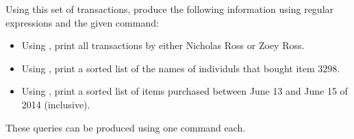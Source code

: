 Using this set of transactions, produce the following information using regular expressions and the given command:
\begin{itemize}
    \item Using , print all transactions by either Nicholas Ross or Zoey Ross.
    \item Using , print a sorted list of the names of individuls that bought item $3298$.
    \item Using , print a sorted list of items purchased between June 13 and June 15 of 2014 (inclusive).
\end{itemize}
These queries can be produced using one command each.
